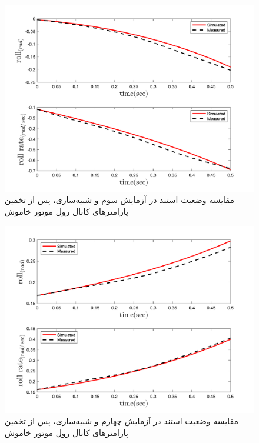 \begin{figure}[H]
	\includegraphics[width=12cm]{../Figures/RCP/roll_ml_parameter_estimation/RCP_roll_S3.png}
	\centering
	\caption{مقايسه وضعیت استند در  آزمايش سوم و شبیه‌سازی، پس از تخمین پارامترهای کانال رول موتور خاموش}
	\label{roll_ml_ps3}
\end{figure}
\begin{figure}[H]
	\includegraphics[width=12cm]{../Figures/RCP/roll_ml_parameter_estimation/RCP_roll_S4.png}
	\centering
	\caption{مقايسه وضعیت استند در  آزمايش چهارم و شبیه‌سازی، پس از تخمین پارامترهای کانال رول موتور خاموش}
	\label{roll_ml_ps4}
\end{figure}
